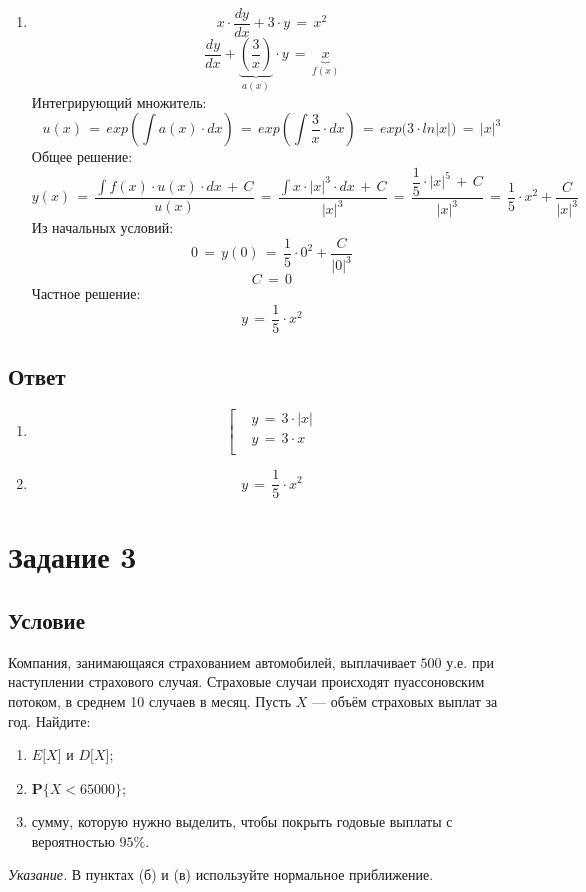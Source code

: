 \documentclass{article}
\begin{document}
\begin{enumerate}
\begin{equation*}
\begin{aligned}
& y \, = \, 3 \! \cdot \! x \\
\end{aligned}
\right.
\end{equation*}
\item[б)]
\[ x \! \cdot \! \dfrac{dy}{dx} \! + \! 3 \! \cdot \! y \, = \, x^2 \]
\[ \dfrac{dy}{dx} \! + \! \underbrace{\left( \dfrac{3}{x} \right)}_{a(x)} \cdot y \, = \, \underbrace{x}_{f(x)} \]
Интегрирующий множитель:
\[ u(x) \, = \, exp \left( \int a(x) \cdot dx \right) \, = \, exp \left( \int \frac{3}{x} \cdot dx \right) \, = \, exp \Big( 3 \! \cdot \! ln|x| \Big) \, = \, |x|^3 \]
Общее решение:
\[ y(x) \, = \, \dfrac{\int f(x) \! \cdot \! u(x) \! \cdot \! dx \, + \, C}{u(x)} \, = \, \dfrac{\int x \! \cdot \! |x|^3 \! \cdot \! dx \, + \, C}{|x|^3} \, = \, \dfrac{\dfrac{1}{5} \! \cdot \!  |x|^5 \, + \, C}{|x|^3} \, = \, \dfrac{1}{5} \! \cdot \! x^2 \! + \! \dfrac{C}{|x|^3} \]
Из начальных условий:
\[ 0 \, = \, y(0) \, = \, \dfrac{1}{5} \! \cdot \! 0^2 \! + \! \dfrac{C}{|0|^3} \]
\[ C \, = \, 0 \]
Частное решение:
\[ y \, = \, \dfrac{1}{5} \! \cdot \! x^2 \]
\end{enumerate}
\subsection*{Ответ}
\begin{enumerate}
\item[а)]
\begin{equation*}
\left[
\begin{aligned}
& y \, = \, 3 \! \cdot \! |x| \\
& y \, = \, 3 \! \cdot \! x \\
\end{aligned}
\right.
\end{equation*}
\item[б)]
\[ y \, = \, \dfrac{1}{5} \! \cdot \! x^2 \]
\end{enumerate}
\section*{Задание 3}
\subsection*{Условие}
Компания, занимающаяся страхованием автомобилей, выплачивает $ 500 $ у.е. при наступлении страхового случая. Страховые случаи происходят пуассоновским потоком, в среднем 10 случаев в месяц. Пусть $ X $ — объём страховых выплат за год. Найдите:
\begin{enumerate}
\item[а)] $ E \big[ X \big] $ и $ D \big[ X \big] $;
\item[б)] $ \mathbf{P} \big\{ X < 65000 \big\} $;
\item[в)] сумму, которую нужно выделить, чтобы покрыть годовые выплаты с вероятностью $ 95\% $.
\end{enumerate}
\textit{Указание.} В пунктах (б) и (в) используйте нормальное приближение.
\end{document}

